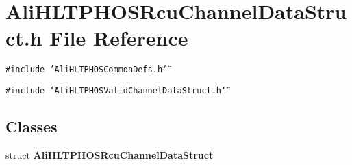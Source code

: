 \section{Ali\-HLTPHOSRcu\-Channel\-Data\-Struct.h File Reference}
\label{AliHLTPHOSRcuChannelDataStruct_8h}


{\tt \#include \char`\"{}Ali\-HLTPHOSCommon\-Defs.h\char`\"{}}\par
{\tt \#include \char`\"{}Ali\-HLTPHOSValid\-Channel\-Data\-Struct.h\char`\"{}}\par
\subsection*{Classes}
\begin{CompactItemize}
\item 
struct {\bf Ali\-HLTPHOSRcu\-Channel\-Data\-Struct}
\end{CompactItemize}

